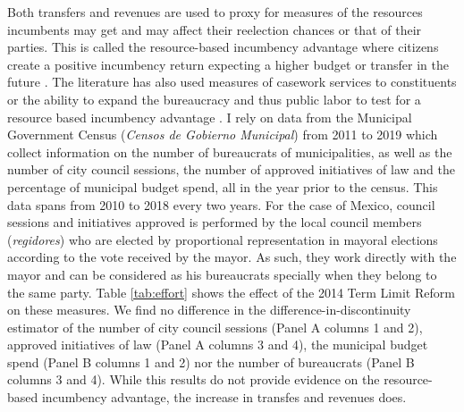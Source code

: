 \documentclass[12pt]{amsart}
\numberwithin{equation}{section}
\theoremstyle{definition}
\theoremstyle{definition}
\theoremstyle{definition}
\begin{document}
Both transfers and revenues are used to proxy for measures of the resources incumbents may get and may affect their reelection chances or that of their parties. This is called the resource-based incumbency advantage where citizens create a positive incumbency return expecting a higher budget or transfer in the future \citep{cox_morgensten_1993}. The literature has also used measures of casework services to constituents or the ability to expand the bureaucracy and thus public labor to test for a resource based incumbency advantage \citep{cox_katz_1996}. I rely on data from the Municipal Government Census (\emph{Censos de Gobierno Municipal}) from 2011 to 2019 which collect information on the number of bureaucrats of municipalities, as well as the number of city council sessions, the number of approved initiatives of law and the percentage of municipal budget spend, all in the year prior to the census. This data spans from 2010 to 2018 every two years. For the case of Mexico, council sessions and initiatives approved is performed by the local council members (\emph{regidores}) who are elected by proportional representation in mayoral elections according to the vote received by the mayor. As such, they work directly with the mayor and can be considered as his bureaucrats specially when they belong to the same party. Table \ref{tab:effort} shows the effect of the 2014 Term Limit Reform on these  measures. We find no difference in the difference-in-discontinuity estimator of the number of city council sessions (Panel A columns 1 and 2), approved initiatives of law (Panel A columns 3 and 4), the municipal budget spend (Panel B columns 1 and 2) nor the number of bureaucrats (Panel B columns 3 and 4). While this results do not provide evidence on the resource-based incumbency advantage, the increase in transfes and revenues does. 
   
\end{document}
